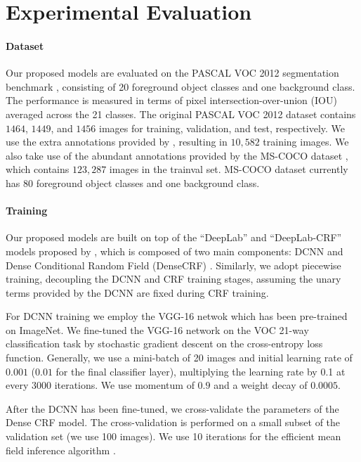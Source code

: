 \section{Experimental Evaluation}
\label{sec:experiments}

\paragraph{Dataset} Our proposed models are evaluated on the PASCAL VOC 2012 segmentation benchmark \citep{everingham2014pascal}, consisting of 20 foreground object classes and one background class. The performance is measured in terms of pixel intersection-over-union (IOU) averaged across the 21 classes. The original PASCAL VOC 2012 dataset contains $1464$, $1449$, and $1456$ images for training, validation, and test, respectively. We use the extra annotations provided by \citet{hariharan2011semantic}, resulting in $10,582$ training images. We also take use of the abundant annotations provided by the MS-COCO dataset \citep{lin2014microsoft}, which contains $123,287$ images in the trainval set. MS-COCO dataset currently has $80$ foreground object classes and one background class.

\paragraph{Training} Our proposed models are built on top of the ``DeepLab'' and ``DeepLab-CRF'' models proposed by \citep{chen2014semantic}, which is composed of two main components: DCNN and Dense Conditional Random Field (DenseCRF) \citep{krahenbuhl2011efficient}. Similarly, we adopt piecewise training, decoupling the DCNN and CRF training stages, assuming the unary terms provided by the DCNN are fixed during CRF training. 

For DCNN training we employ the VGG-16 netwok which has been pre-trained on ImageNet. We fine-tuned the VGG-16 network on the VOC 21-way classification task by stochastic gradient descent on the cross-entropy loss function. Generally, we use a mini-batch of 20 images and initial learning rate of $0.001$ ($0.01$ for the final classifier layer), multiplying the learning rate by 0.1 at every 3000 iterations. We use momentum of $0.9$ and a weight decay of $0.0005$.

After the DCNN has been fine-tuned, we cross-validate the parameters of the Dense CRF model. The cross-validation is performed on a small subset of the validation set (we use 100 images). We use 10 iterations for the efficient mean field inference algorithm \citep{krahenbuhl2011efficient}.

